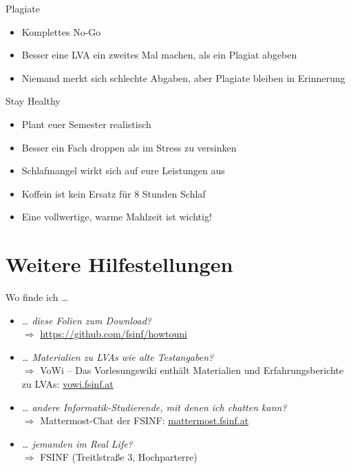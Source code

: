 \documentclass{beamer}
\begin{document}
\begin{frame}{Plagiate}
    \begin{itemize}
        \item Komplettes No-Go
        \item Besser eine LVA ein zweites Mal machen, als ein Plagiat abgeben
        \item Niemand merkt sich schlechte Abgaben, aber Plagiate bleiben in Erinnerung
    \end{itemize}
\end{frame}

\begin{frame}{Stay Healthy}
    \begin{itemize}
        \item Plant euer Semester realistisch
        \item Besser ein Fach droppen als im Stress zu versinken
        \item Schlafmangel wirkt sich auf eure Leistungen aus
        \item Koffein ist kein Ersatz für 8 Stunden Schlaf
        \item Eine vollwertige, warme Mahlzeit ist wichtig!
    \end{itemize}
\end{frame}

\section{Weitere Hilfestellungen}

\begin{frame}{Wo finde ich \ldots}
    \begin{itemize}
        \item \textit{\ldots{} diese Folien zum Download?} \\
              $\Rightarrow$ \url{https://github.com/fsinf/howtouni}
        \item \textit{\ldots{} Materialien zu LVAs wie alte Testangaben?} \\
              $\Rightarrow$ VoWi -- Das Vorlesungswiki enthält Materialien und
              Erfahrungsberichte zu LVAs: \url{vowi.fsinf.at}
        \item \textit{\ldots{} andere Informatik-Studierende, mit denen ich
              chatten kann?} \\
              $\Rightarrow$ Mattermost-Chat der FSINF: \url{mattermost.fsinf.at}
        \item \textit{\ldots{} jemanden im Real Life?} \\
              $\Rightarrow$ FSINF (Treitlstraße 3, Hochparterre)
    \end{itemize}
\end{frame}
\end{document}
